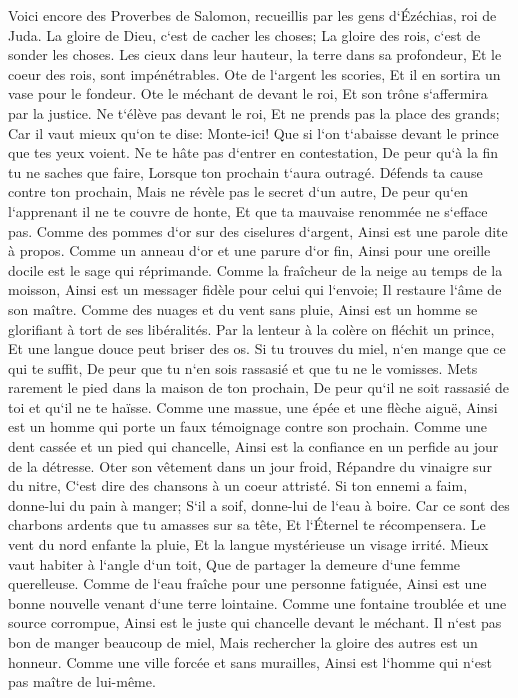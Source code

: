 \verse Voici encore des Proverbes de Salomon, recueillis par les gens d`Ézéchias, roi de Juda. 
\verse La gloire de Dieu, c`est de cacher les choses; La gloire des rois, c`est de sonder les choses. 
\verse Les cieux dans leur hauteur, la terre dans sa profondeur, Et le coeur des rois, sont impénétrables. 
\verse Ote de l`argent les scories, Et il en sortira un vase pour le fondeur. 
\verse Ote le méchant de devant le roi, Et son trône s`affermira par la justice. 
\verse Ne t`élève pas devant le roi, Et ne prends pas la place des grands; 
\verse Car il vaut mieux qu`on te dise: Monte-ici! Que si l`on t`abaisse devant le prince que tes yeux voient. 
\verse Ne te hâte pas d`entrer en contestation, De peur qu`à la fin tu ne saches que faire, Lorsque ton prochain t`aura outragé. 
\verse Défends ta cause contre ton prochain, Mais ne révèle pas le secret d`un autre, 
\verse De peur qu`en l`apprenant il ne te couvre de honte, Et que ta mauvaise renommée ne s`efface pas. 
\verse Comme des pommes d`or sur des ciselures d`argent, Ainsi est une parole dite à propos. 
\verse Comme un anneau d`or et une parure d`or fin, Ainsi pour une oreille docile est le sage qui réprimande. 
\verse Comme la fraîcheur de la neige au temps de la moisson, Ainsi est un messager fidèle pour celui qui l`envoie; Il restaure l`âme de son maître. 
\verse Comme des nuages et du vent sans pluie, Ainsi est un homme se glorifiant à tort de ses libéralités. 
\verse Par la lenteur à la colère on fléchit un prince, Et une langue douce peut briser des os. 
\verse Si tu trouves du miel, n`en mange que ce qui te suffit, De peur que tu n`en sois rassasié et que tu ne le vomisses. 
\verse Mets rarement le pied dans la maison de ton prochain, De peur qu`il ne soit rassasié de toi et qu`il ne te haïsse. 
\verse Comme une massue, une épée et une flèche aiguë, Ainsi est un homme qui porte un faux témoignage contre son prochain. 
\verse Comme une dent cassée et un pied qui chancelle, Ainsi est la confiance en un perfide au jour de la détresse. 
\verse Oter son vêtement dans un jour froid, Répandre du vinaigre sur du nitre, C`est dire des chansons à un coeur attristé. 
\verse Si ton ennemi a faim, donne-lui du pain à manger; S`il a soif, donne-lui de l`eau à boire. 
\verse Car ce sont des charbons ardents que tu amasses sur sa tête, Et l`Éternel te récompensera. 
\verse Le vent du nord enfante la pluie, Et la langue mystérieuse un visage irrité. 
\verse Mieux vaut habiter à l`angle d`un toit, Que de partager la demeure d`une femme querelleuse. 
\verse Comme de l`eau fraîche pour une personne fatiguée, Ainsi est une bonne nouvelle venant d`une terre lointaine. 
\verse Comme une fontaine troublée et une source corrompue, Ainsi est le juste qui chancelle devant le méchant. 
\verse Il n`est pas bon de manger beaucoup de miel, Mais rechercher la gloire des autres est un honneur. 
\verse Comme une ville forcée et sans murailles, Ainsi est l`homme qui n`est pas maître de lui-même. 

